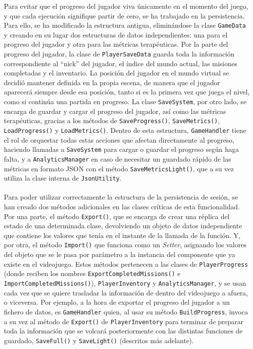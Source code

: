 \documentclass[12pt,twoside,titlepage]{report}
\begin{document}
Para evitar que el progreso del jugador viva únicamente en el momento del juego, y que cada ejecución signifique partir de cero, se ha trabajado en la persistencia.
Para ello, se ha modificado la estructura antigua, eliminándose la clase \texttt{GameData} y creando en su lugar dos estructuras de datos independientes: una para el progreso del jugador y otra para las métricas terapéuticas.
Por la parte del progreso del jugador, la clase de \texttt{PlayerSaveData} guarda toda la información correspondiente al ``nick'' del jugador, el índice del mundo actual, las misiones completadas y el inventario.
La posición del jugador en el mundo virtual se decidió mantener definida en la propia escena, de manera que el jugador aparecerá siempre desde esa posición, tanto si es la primera vez que juega el nivel, como si continúa una partida en progreso.
La clase \texttt{SaveSystem}, por otro lado, se encarga de guardar y cargar el progreso del jugador, así como las métricas terapéuticas, gracias a los métodos de \texttt{SaveProgress()}, \texttt{SaveMetrics()},
\texttt{LoadProgress()} y \texttt{LoadMetrics()}.
Dentro de esta estructura, \texttt{GameHandler} tiene el rol de orquestar todas estas acciones que afectan directamente al progreso, haciendo llamadas a \texttt{SaveSystem} para cargar o guardar el progreso según haga falta, y a \texttt{AnalyticsManager} en caso de necesitar un guardado rápido de las métricas en formato JSON con el método \texttt{SaveMetricsLight()}, que a su vez utiliza la clase interna de \texttt{JsonUtility}.
\\\\
Para poder utilizar correctamente la estructura de la persistencia de sesión, se han creado dos métodos adicionales en las clases críticas de esta funcionalidad. Por una parte, el método \texttt{Export()}, que se encarga de crear una réplica del estado de una determinada clase, devolviendo un objeto de datos independiente que contiene los valores que tenía en el instante de la llamada de la función.
Y, por otra, el método \texttt{Import()} que funciona como un \textit{Setter}, asignando los valores del objeto que se le pasa por parámetro a la instancia del componente que ya existe en el videojuego.
Estos métodos pertenecen a las clases de \texttt{PlayerProgress} (donde reciben los nombres \texttt{ExportCompletedMissions()} e \texttt{ImportCompletedMissions()}), \texttt{PlayerInventory} y \texttt{AnalyticsManager}, y se usan cada vez que se quiere trasladar la información de dentro del videojuego a afuera, o viceversa.
Por ejemplo, a la hora de exportar el progreso del jugador a un fichero de datos, es \texttt{GameHandler} quien, al usar su método \texttt{BuildProgress}, invoca a su vez al método de \texttt{Export()} de \texttt{PlayerInventory} para terminar de preparar toda la información que se volcará posteriormente con las distintas funciones de guardado, \texttt{SaveFull()} y \texttt{SaveLight()} (descritos más adelante).
\end{document}
